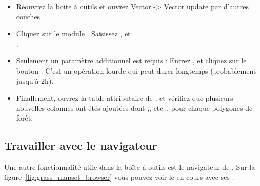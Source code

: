 \begin{itemize}[label=--]
\item Réouvrez la boite à outils \grass et ouvrez Vector -> Vector update par d'autres couches
\item Cliquez sur le module . Saisissez , et\\.
\item Seulement un paramètre additionnel est requis : Entrez  , et cliquez sur le bouton . C'est un opération lourde qui peut durer longtemps (probablement jusqu'à 2h).
\item Finallement, ouvrez la table attributaire de , et vérifiez que plusieurs nouvelles colonnes ont étés ajoutées dont ,,  etc... pour chaque polygones de forêt.
\end{itemize}

\subsection{Travailler avec le navigateur \grass} 

Une autre fonctionnalité utile dans la boîte à outils \grass est le navigateur de  \grass. Sur la figure~\ref{fig:grass_mapset_browser}
vous pouvez voir le  en cours  avec ses .

